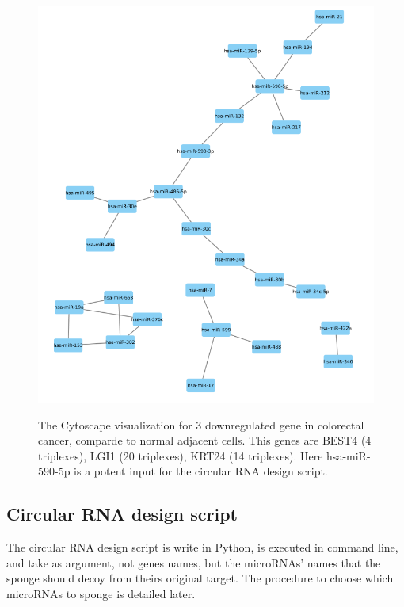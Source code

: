 \documentclass[a4paper,12pt]{report}
\begin{document}
\begin{figure}[H]
	\centering
	{\includegraphics[width=1\textwidth]{cytoscape_output.png}}
	\caption{The Cytoscape visualization for 3 downregulated gene in colorectal cancer, comparde to normal adjacent cells. This genes are BEST4 (4 triplexes), LGI1 (20 triplexes), KRT24 (14 triplexes). Here hsa-miR-590-5p is a potent input for the circular RNA design script.}
\end{figure}

\subsection{Circular RNA design script}

The circular RNA design script is write in Python, is executed in command line, and take as argument, not genes names, but the microRNAs' names that the sponge should decoy from theirs original target. The procedure to choose which microRNAs to sponge is detailed later.\\
\end{document}
